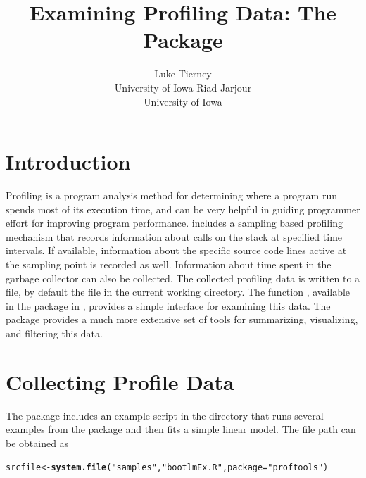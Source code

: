 \documentclass[nojss]{jss}\usepackage[]{graphicx}\usepackage[]{color}
\author{Luke Tierney\\University of Iowa \And 
        Riad Jarjour\\University of Iowa}
\title{Examining \proglang{R} Profiling Data: The \pkg{proftools} Package}
\makeatletter
\newcommand{\hlstr}[1]{\textcolor[rgb]{0.192,0.494,0.8}{#1}}%
\newcommand{\hlstd}[1]{\textcolor[rgb]{0.345,0.345,0.345}{#1}}%
\newcommand{\hlkwb}[1]{\textcolor[rgb]{0.69,0.353,0.396}{#1}}%
\newcommand{\hlkwc}[1]{\textcolor[rgb]{0.333,0.667,0.333}{#1}}%
\newcommand{\hlkwd}[1]{\textcolor[rgb]{0.737,0.353,0.396}{\textbf{#1}}}%
\newenvironment{kframe}{%
 \def\at@end@of@kframe{}%
 \ifinner\ifhmode%
  \def\at@end@of@kframe{\end{minipage}}%
  \begin{minipage}{\columnwidth}%
 \fi\fi%
 \def\FrameCommand##1{\hskip\@totalleftmargin \hskip-\fboxsep
 \colorbox{shadecolor}{##1}\hskip-\fboxsep
     \hskip-\linewidth \hskip-\@totalleftmargin \hskip\columnwidth}%
 \MakeFramed {\advance\hsize-\width
   \@totalleftmargin\z@ \linewidth\hsize
   \@setminipage}}%
 {\par\unskip\endMakeFramed%
 \at@end@of@kframe}
\newenvironment{knitrout}{}{} %
\makeatother
\begin{document}

\section{Introduction}

Profiling is a program analysis method for determining where a program
run spends most of its execution time, and can be very helpful in
guiding programmer effort for improving program performance.
 includes a sampling based profiling mechanism that
records information about calls on the stack at specified time
intervals.  If available, information about the specific source code
lines active at the sampling point is recorded as well. Information
about time spent in the garbage collector can also be collected. The
collected profiling data is written to a file, by default the file
 in the current working directory.  The function
, available in the  package in
, provides a simple interface for examining this data. The
 package provides a much more extensive set of tools
for summarizing, visualizing, and filtering this data.

\section{Collecting Profile Data}
The  package includes an example script 
in the  directory that runs several examples from the
 package \citep{CantyRipley:Boot} and then fits a simple
linear model. The file path can be obtained as
\begin{knitrout}\small
{}\color{fgcolor}\begin{kframe}
\begin{alltt}
\hlstd{srcfile} \hlkwb{<-} \hlkwd{system.file}\hlstd{(}\hlstr{"samples"}\hlstd{,} \hlstr{"bootlmEx.R"}\hlstd{,} \hlkwc{package} \hlstd{=} \hlstr{"proftools"}\hlstd{)}
\end{alltt}
\end{kframe}
\end{knitrout}
\end{document}
